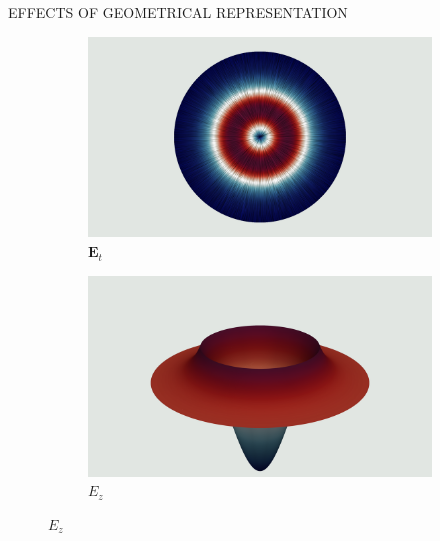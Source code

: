 \documentclass[debug]{beamer} %
\begin{document}
\begin{frame}
\begin{columns}
\begin{column}{0.45\textwidth}
{\begin{block}{\boxnumber EFFECTS OF GEOMETRICAL REPRESENTATION}
	        \begin{figure}[hb]
	        	\begin{mdframed}[backgroundcolor=bggrey]
					\centering
					\begin{subfigure}[b]{.4\textwidth}
						\centering
						\caption*{$\displaystyle\bm{E}_t$}
						\includegraphics[width=1\linewidth]{images/et2posterStepFiber.png}%
					\end{subfigure}\hfill
					\begin{subfigure}[b]{.4\textwidth}
						\centering
						\caption*{$\displaystyle E_z$}
						\includegraphics[width=1\linewidth]{images/ez2posterStepFiber.png}%
					\end{subfigure}


\end{mdframed}
\end{figure}
\end{block}}
\end{column}
\end{columns}
\end{frame}
\end{document}
